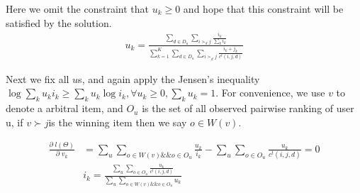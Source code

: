 \documentclass{article}
\begin{document}
Here we omit the constraint that $u_k \geq 0$ and hope that this constraint will be satisfied by the solution.
\begin{align}
u_k = \frac{\sum_{d\in D_u} \sum_{i \succ_d j} \frac{i_k}{\sum_k i_k} }{\sum_{k=1}^K \sum_{d\in D_u} \sum_{i \succ_d j}\frac{i_k+j_k}{c^t(i,j,d)}}
\end{align}

Next we fix all $u$s, and again apply the Jensen’s inequality $\log \sum_k u_k i_k \geq \sum_k u_k \log i_k,\forall u_k \geq 0,\sum_k u_k=1 $.  For convenience, we use $v$  to denote a arbitral item, and $O_u$  is the set of all observed pairwise ranking of user u, if $ v \succ j $is the winning item then we say $o \in W(v)$.


\begin{align}
\frac{\partial \;l(\Theta) }{\partial \;v_k}
 &=\sum_{u} \sum_{o \in W(v) \&\& o \in O_u} \frac{u_k}{i_k} - \sum_{u} \sum_{o \in O_u} \frac{u_k}{c^t(i, j, d)} =0\\
 & i_k =\frac{\sum_{u} \sum_{o \in O_u} \frac{u_k}{c^t(i, j, d)}}{\sum_{u} \sum_{o \in W(v) \&\& o \in O_u} u_k}
\end{align}
\end{document}
